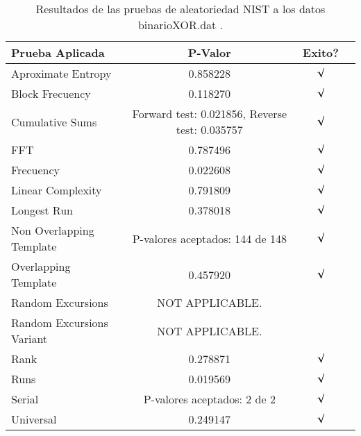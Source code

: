 \documentclass[12pt,3p]{elsarticle}
\begin{document}
\begin{table}[!h]
\caption{Resultados de las pruebas de aleatoriedad NIST a los datos binarioXOR.dat .}
\label{sample-table}
\vskip 0.15in
\begin{center}
\begin{small}
\begin{sc}
\begin{tabular}{lccr}
\hline

Prueba Aplicada &  P-Valor & Exito? \\
\hline

Aproximate Entropy    &   0.858228  & $\surd$ \\

Block Frecuency  & 0.118270  &  $\surd$  \\

Cumulative Sums    &   Forward test: 0.021856, Reverse test: 0.035757  & $\surd$ \\

FFT    &   0.787496 &   $\surd$      \\

Frecuency     &  0.022608 &  $\surd$   \\

Linear Complexity      &  0.791809  & $\surd$ \\

Longest Run      &   0.378018  &    $\surd$      \\

Non Overlapping Template      & P-valores aceptados: 144 de 148    &     $\surd$          \\

Overlapping Template      &  0.457920 &        $\surd$       \\

Random Excursions      &  NOT APPLICABLE. &             \\

Random Excursions Variant & NOT APPLICABLE. &          \\

Rank &    0.278871   &       $\surd$      \\

Runs &    0.019569  &     $\surd$        \\

Serial &     P-valores aceptados: 2 de 2    &     $\surd$        \\

Universal &      0.249147 &   $\surd$            \\

\hline



\end{tabular}
\end{sc}
\end{small}
\end{center}
\vskip -0.1in
\end{table}
\end{document}
